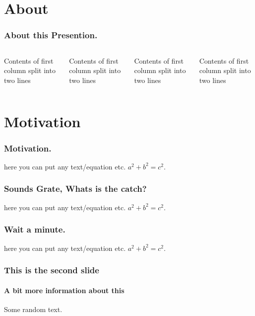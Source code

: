\documentclass{beamer}
\begin{document}
     \section{About}
	\begin{frame}
	  \frametitle{ About this Presention.  }
	   \begin{columns}[T] %
     \begin{column}{.23\textwidth} %
     Contents of first column \newline split into two lines
     \end{column}
     \begin{column}{.23\textwidth} %
     Contents of first column \newline split into two lines
     \end{column}
     \begin{column}{.23\textwidth} %
     Contents of first column \newline split into two lines
     \end{column}
     \begin{column}{.23\textwidth} %
     Contents of first column \newline split into two lines
     \end{column}
     \end{columns}
	\end{frame}
	\section{Motivation}
	\begin{frame}
	  \frametitle{ Motivation. }
		here you can put any text/equation etc. 
		$a^2 + b^2 = c^2$.		
	\end{frame}\begin{frame}
	  \frametitle{ Sounds Grate, Whats is the catch? }
		here you can put any text/equation etc. 
		$a^2 + b^2 = c^2$.		
	\end{frame}\begin{frame}
	  \frametitle{ Wait a minute. }
		here you can put any text/equation etc. 
		$a^2 + b^2 = c^2$.		
	\end{frame}
	\begin{frame}
		\frametitle{This is the second slide}
		\framesubtitle{A bit more information about this}
		Some random text.		
	\end{frame}
\end{document}
